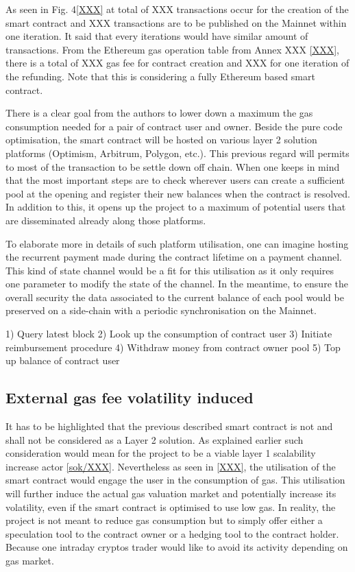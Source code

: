     As seen in Fig. 4\ref{XXX} at total of XXX transactions occur for the creation of the smart contract and XXX transactions are to be published on the Mainnet within one iteration. It said that every iterations would have similar amount of transactions. From the Ethereum gas operation table from Annex XXX \ref{XXX}, there is a total of XXX gas fee for contract creation and XXX for one iteration of the refunding. Note that this is considering a fully Ethereum based smart contract.
    
    
    There is a clear goal from the authors to lower down a maximum the gas consumption needed for a pair of contract user and owner. Beside the pure code optimisation, the smart contract will be hosted on various layer 2 solution platforms (Optimism, Arbitrum, Polygon, etc.). This previous regard will permits to most of the transaction to be settle down off chain. When one keeps in mind that the most important steps are to check wherever users can create a sufficient pool at the opening and register their new balances when the contract is resolved. In addition to this, it opens up the project to a maximum of potential users that are disseminated already along those platforms.
    
    To elaborate more in details of such platform utilisation, one can imagine hosting the recurrent payment made during the contract lifetime on a payment channel. This kind of state channel would be a fit for this utilisation as it only requires one parameter to modify the state of the channel.
    In the meantime, to ensure the overall security the data associated to the current balance of each pool would be preserved on a side-chain with a periodic synchronisation on the Mainnet.
    
    
    1) Query latest block
    2) Look up the consumption of contract user
    3) Initiate reimbursement procedure
    4) Withdraw money from contract owner pool
    5) Top up balance of contract user
     
  \subsection{ External gas fee volatility induced}
    
    It has to be highlighted that the previous described smart contract is not and shall not be considered as a Layer 2 solution. As explained earlier such consideration would mean for the project to be a viable layer 1 scalability increase actor \ref{sok/XXX}. Nevertheless as seen in \ref{XXX}, the utilisation of the smart contract would engage the user in the consumption of gas. This utilisation will further induce the actual gas valuation market and potentially increase its volatility, even if the smart contract is optimised to use low gas. In reality, the project is not meant to reduce gas consumption but to simply offer either a speculation tool to the contract owner or a hedging tool to the contract holder. Because one intraday cryptos trader would like to avoid its activity depending on gas market.
    
